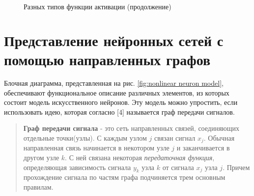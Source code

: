 \documentclass[a4paper,12pt]{report}
\begin{document}
\begin{figure}[!hbt]
    \centering
    \hspace{10pt}
    \caption{Разных типов функции активации
    (продолжение)}
\end{figure}

\section{Представление нейронных сетей с помощью направленных графов}
\label{sec:graphs}
Блочная диаграмма, представленная на рис. \ref{fig:nonlinear neuron model},
обеспечивают функциональное описание различных элементов, из
которых состоит модель искусственного нейронов. Эту модель можно
упростить, если использовать идею, которая согласно [4]
называется граф передачи сигналов.
\begin{quote}
    \textbf{Граф передачи сигнала} - это сеть направленных связей,
    соединяющих отдельные точки(узлы). С каждым узлом $j$ связан
    сигнал $x_j$. Обычная направленная связь начинается в некотором
    узле $j$ и заканчивается в другом узле $k$. С ней связана
    некоторая \textit{передаточная функция}, определяющая зависимость
    сигнала
    $y_k$ узла $k$ от сигнала $x_j$ узла $j$. Причем прохождение
    сигнала по частям графа подчиняется трем основным правилам.
\end{quote}
\end{document}
